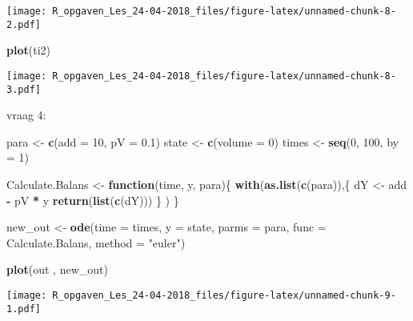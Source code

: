 \documentclass[]{article}
\newenvironment{Shaded}{\begin{snugshade}}{\end{snugshade}}
\newcommand{\KeywordTok}[1]{\textcolor[rgb]{0.13,0.29,0.53}{\textbf{#1}}}
\newcommand{\DataTypeTok}[1]{\textcolor[rgb]{0.13,0.29,0.53}{#1}}
\newcommand{\DecValTok}[1]{\textcolor[rgb]{0.00,0.00,0.81}{#1}}
\newcommand{\FloatTok}[1]{\textcolor[rgb]{0.00,0.00,0.81}{#1}}
\newcommand{\StringTok}[1]{\textcolor[rgb]{0.31,0.60,0.02}{#1}}
\newcommand{\ControlFlowTok}[1]{\textcolor[rgb]{0.13,0.29,0.53}{\textbf{#1}}}
\newcommand{\OperatorTok}[1]{\textcolor[rgb]{0.81,0.36,0.00}{\textbf{#1}}}
\newcommand{\NormalTok}[1]{#1}
\begin{document}
\texttt{[image: R\_opgaven\_Les\_24-04-2018\_files/figure-latex/unnamed-chunk-8-2.pdf]}

\begin{Shaded}
\begin{Highlighting}[]
\KeywordTok{plot}\NormalTok{(ti2)}
\end{Highlighting}
\end{Shaded}

\texttt{[image: R\_opgaven\_Les\_24-04-2018\_files/figure-latex/unnamed-chunk-8-3.pdf]}

vraag 4:

\begin{Shaded}
\begin{Highlighting}[]
\NormalTok{para <-}\StringTok{ }\KeywordTok{c}\NormalTok{(}\DataTypeTok{add =} \DecValTok{10}\NormalTok{, }\DataTypeTok{pV =} \FloatTok{0.1}\NormalTok{)}
\NormalTok{state <-}\StringTok{ }\KeywordTok{c}\NormalTok{(}\DataTypeTok{volume =} \DecValTok{0}\NormalTok{)}
\NormalTok{times <-}\StringTok{ }\KeywordTok{seq}\NormalTok{(}\DecValTok{0}\NormalTok{, }\DecValTok{100}\NormalTok{,  }\DataTypeTok{by =} \DecValTok{1}\NormalTok{)}

\NormalTok{Calculate.Balans <-}\StringTok{ }\ControlFlowTok{function}\NormalTok{(time, y, para)\{}
 \KeywordTok{with}\NormalTok{(}\KeywordTok{as.list}\NormalTok{(}\KeywordTok{c}\NormalTok{(para)),\{}
\NormalTok{         dY <-}\StringTok{ }\NormalTok{add }\OperatorTok{-}\StringTok{ }\NormalTok{pV }\OperatorTok{*}\StringTok{ }\NormalTok{y}
         \KeywordTok{return}\NormalTok{(}\KeywordTok{list}\NormalTok{(}\KeywordTok{c}\NormalTok{(dY)))}
\NormalTok{       \}}
\NormalTok{       )}
\NormalTok{\}}

\NormalTok{new_out <-}\StringTok{ }\KeywordTok{ode}\NormalTok{(}\DataTypeTok{time =}\NormalTok{ times,}
           \DataTypeTok{y =}\NormalTok{ state,}
           \DataTypeTok{parms =}\NormalTok{ para,}
           \DataTypeTok{func =}\NormalTok{ Calculate.Balans,}
           \DataTypeTok{method =} \StringTok{"euler"}\NormalTok{)}

\KeywordTok{plot}\NormalTok{(out , new_out)}
\end{Highlighting}
\end{Shaded}

\texttt{[image: R\_opgaven\_Les\_24-04-2018\_files/figure-latex/unnamed-chunk-9-1.pdf]}
\end{document}
